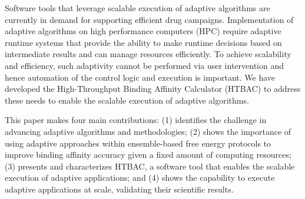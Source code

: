 
 


Software tools that leverage scalable execution of adaptive algorithms are
currently in demand for supporting efficient drug campaigns. Implementation
of adaptive algorithms on high performance computers (HPC) require adaptive
runtime systems that provide the ability to make runtime decisions based on
intermediate results and can manage resources efficiently. To achieve
scalability and efficiency, such adaptivity cannot be performed via user
intervention and hence automation of the control logic and execution is
important. We have developed the High-Throughput Binding Affinity Calculator
(HTBAC) to address these needs to enable the scalable execution of adaptive
algorithms.



This paper makes four main contributions: (1) identifies the challenge in
advancing adaptive algorithms and methodologies; (2) shows the importance of
using adaptive approaches within ensemble-based free energy protocols to
improve binding affinity accuracy given a fixed amount of computing
resources; (3) presents and characterizes HTBAC, a software tool that enables
the scalable execution of adaptive applications; and (4) shows the capability
to execute adaptive applications at scale, validating their scientific
results.

